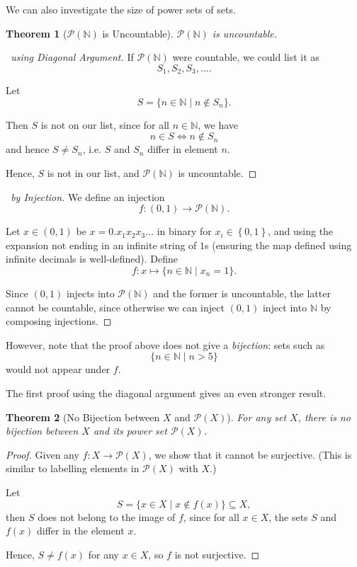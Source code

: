 \documentclass{article}
\newtheorem{theorem}{Theorem}[section]
\theoremstyle{definition}
\theoremstyle{remark}
\newcommand{\pqty}[1]{\left(#1\right)}
\newcommand{\Bqty}[1]{\left\{#1\right\}}
\newcommand{\set}[2]{\{#1\mid #2\}}
\newcommand{\functiondomain}[3]{#1:#2\to #3}
\newcommand{\functionmap}[3]{#1:#2\mapsto #3}
\newcommand{\oointv}[2]{(#1,#2)}
\newcommand{\powerset}{\mathcal{P}}
\newcommand{\NN}{\mathbb{N}}
\begin{document}
We can also investigate the size of power sets of sets.

\begin{theorem}[\(\powerset\pqty{\NN}\) is Uncountable]
    \(\powerset\pqty{\NN}\) is uncountable.
\end{theorem}

\begin{proof}[\proofname\ using Diagonal Argument]
    If \(\powerset\pqty{\NN}\) were countable, we could list it as
    \[
        S_1, S_2, S_3, \ldots.
    \]

    Let
    \[
        S = \set{n \in \NN}{n \notin S_n}.
    \]

    Then \(S\) is not on our list, since for all \(n \in \NN\), we have
    \[
        n \in S \iff n \notin S_n
    \]
    and hence \(S \neq S_n\), i.e. \(S\) and \(S_n\) differ in element \(n\).

    Hence, \(S\) is not in our list, and \(\powerset\pqty{\NN}\) is uncountable.
\end{proof}

\begin{proof}[\proofname\ by Injection]
    We define an injection
    \[
        \functiondomain{f}{\oointv{0}{1}}{\powerset\pqty{\NN}}.
    \]

    Let \(x \in \oointv{0}{1}\) be \(x = 0.x_1 x_2 x_3 \ldots\) in binary for \(x_i \in \Bqty{0, 1}\), and using the expansion not ending in an infinite string of \(1\)s (ensuring the map defined using infinite decimals is well-defined). Define
    \[
        \functionmap{f}{x}{\set{n \in \NN}{x_n = 1}}.
    \]

    Since \(\oointv{0}{1}\) injects into \(\powerset\pqty{\NN}\) and the former is uncountable, the latter cannot be countable, since otherwise we can inject \(\oointv{0}{1}\) inject into \(\NN\) by composing injections.
\end{proof}

However, note that the proof above does not give a \emph{bijection}: sets such as
\[
    \set{n \in \NN}{n > 5}
\]
would not appear under \(f\).

The first proof using the diagonal argument gives an even stronger result.

\begin{theorem}[No Bijection between \(X\) and \(\powerset\pqty{X}\)]
    For any set \(X\), there is no bijection between \(X\) and its power set \(\powerset\pqty{X}\).
\end{theorem}

\begin{proof}
    Given any \(\functiondomain{f}{X}{\powerset\pqty{X}}\), we show that it cannot be surjective. (This is similar to labelling elements in \(\powerset\pqty{X}\) with \(X\).)

    Let
    \[
        S = \set{x \in X}{x \notin f\pqty{x}} \subseteq X,
    \]
    then \(S\) does not belong to the image of \(f\), since for all \(x \in X\), the sets \(S\) and \(f\pqty{x}\) differ in the element \(x\).

    Hence, \(S \neq f\pqty{x}\) for any \(x \in X\), so \(f\) is not surjective.
\end{proof}
\end{document}
